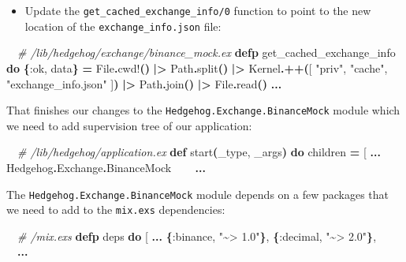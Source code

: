 \documentclass[
  oneside]{book}
\newenvironment{Shaded}{\begin{snugshade}}{\end{snugshade}}
\newcommand{\CommentTok}[1]{\textcolor[rgb]{0.56,0.35,0.01}{\textit{#1}}}
\newcommand{\ConstantTok}[1]{\textcolor[rgb]{0.56,0.35,0.01}{#1}}
\newcommand{\FunctionTok}[1]{\textcolor[rgb]{0.13,0.29,0.53}{\textbf{#1}}}
\newcommand{\KeywordTok}[1]{\textcolor[rgb]{0.13,0.29,0.53}{\textbf{#1}}}
\newcommand{\NormalTok}[1]{#1}
\newcommand{\OperatorTok}[1]{\textcolor[rgb]{0.81,0.36,0.00}{\textbf{#1}}}
\newcommand{\OtherTok}[1]{\textcolor[rgb]{0.56,0.35,0.01}{#1}}
\newcommand{\StringTok}[1]{\textcolor[rgb]{0.31,0.60,0.02}{#1}}
\newcommand{\VariableTok}[1]{\textcolor[rgb]{0.00,0.00,0.00}{#1}}
\providecommand{\tightlist}{%
  \setlength{\itemsep}{0pt}\setlength{\parskip}{0pt}}
\begin{document}
\begin{itemize}
\tightlist
\item
  Update the \texttt{get\_cached\_exchange\_info/0} function to point to the new location of the \texttt{exchange\_info.json} file:
\end{itemize}

\begin{Shaded}
\begin{Highlighting}[]
  \CommentTok{\# /lib/hedgehog/exchange/binance\_mock.ex    }
  \KeywordTok{defp}\NormalTok{ get\_cached\_exchange\_info }\KeywordTok{do}
    \FunctionTok{\{}\VariableTok{:ok}\NormalTok{, data}\FunctionTok{\}} \OperatorTok{=}
      \ConstantTok{File}\OperatorTok{.}\NormalTok{cwd!}\FunctionTok{()}
      \OperatorTok{|\textgreater{}} \ConstantTok{Path}\OperatorTok{.}\NormalTok{split}\FunctionTok{()}
      \OperatorTok{|\textgreater{}} \ConstantTok{Kernel}\OperatorTok{.++}\FunctionTok{(}\OtherTok{[}
        \StringTok{"priv"}\NormalTok{,}
        \StringTok{"cache"}\NormalTok{,}
        \StringTok{"exchange\_info.json"}
      \OtherTok{]}\FunctionTok{)}
      \OperatorTok{|\textgreater{}} \ConstantTok{Path}\OperatorTok{.}\NormalTok{join}\FunctionTok{()}
      \OperatorTok{|\textgreater{}} \ConstantTok{File}\OperatorTok{.}\NormalTok{read}\FunctionTok{()}
    \OperatorTok{...}
\end{Highlighting}
\end{Shaded}

That finishes our changes to the \texttt{Hedgehog.Exchange.BinanceMock} module which we need to add supervision tree of our application:

\begin{Shaded}
\begin{Highlighting}[]
  \CommentTok{\# /lib/hedgehog/application.ex}
  \KeywordTok{def}\NormalTok{ start}\FunctionTok{(}\NormalTok{\_type, \_args}\FunctionTok{)} \KeywordTok{do}
\NormalTok{    children }\OperatorTok{=} \OtherTok{[}
      \OperatorTok{...}
      \ConstantTok{Hedgehog}\OperatorTok{.}\ConstantTok{Exchange}\OperatorTok{.}\ConstantTok{BinanceMock}
    \OperatorTok{...}
\end{Highlighting}
\end{Shaded}

The \texttt{Hedgehog.Exchange.BinanceMock} module depends on a few packages that we need to add to the \texttt{mix.exs} dependencies:

\begin{Shaded}
\begin{Highlighting}[]
  \CommentTok{\# /mix.exs}
  \KeywordTok{defp}\NormalTok{ deps }\KeywordTok{do}
    \OtherTok{[}
      \OperatorTok{...}
      \FunctionTok{\{}\VariableTok{:binance}\NormalTok{, }\StringTok{"\textasciitilde{}\textgreater{} 1.0"}\FunctionTok{\}}\NormalTok{,}
      \FunctionTok{\{}\VariableTok{:decimal}\NormalTok{, }\StringTok{"\textasciitilde{}\textgreater{} 2.0"}\FunctionTok{\}}\NormalTok{,}
      \OperatorTok{...}
\end{Highlighting}
\end{Shaded}
\end{document}
